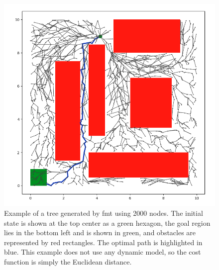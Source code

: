 \begin{figure}[!ht]
    \centering
    \includegraphics[scale=0.5]{./figures/fmt-2000-nodes}
    \caption[FMT* Example]{Example of a tree generated by \gls{fmt} using 2000 nodes. The initial state is shown at the top center as a green hexagon, the goal region lies in the bottom left and is shown in green, and obstacles are represented by red rectangles. The optimal path is highlighted in blue. This example does not use any dynamic model, so the cost function is simply the Euclidean distance.}
\label{fig:fmt_example}
\end{figure}


